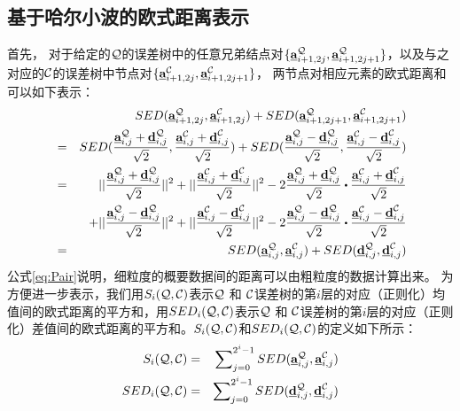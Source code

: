 \subsection{基于哈尔小波的欧式距离表示}
首先， 对于给定的$\cal Q$的误差树中的任意兄弟结点对$\{\emph{{\textbf{a}}}_{i+1,2j}^{\cal Q}, \emph{{\textbf{a}}}_{i+1,2j+1}^{\cal Q}\}$，以及与之对应的$\cal C$的误差树中节点对$\{\emph{{\textbf{a}}}_{i+1, 2j}^{\cal C},  \emph{{\textbf{a}}}_{i+1, 2j+1}^{\cal C} \}$，
 两节点对相应元素的欧式距离和可以如下表示：
  \allowdisplaybreaks
 \begin{eqnarray}\label{eq:Pair}
&& SED(\va_{i+1,2j}^{\cal Q},\va_{i+1,2j}^{\cal C}) + SED(\va_{i+1,2j+1}^{\cal Q},\va_{i+1,2j+1}^{\cal C}) \\ \nonumber
&=& SED(\frac{\va_{i,j}^{\cal Q} + \vd_{i,j}^{\cal Q}}{\sqrt{2}}, \frac{\va_{i,j}^{\cal C}+ \vd_{i,j}^{\cal C}}{\sqrt{2}}) + 
SED(\frac{\va_{i,j}^{\cal Q} - \vd_{i,j}^{\cal Q}}{\sqrt{2}}, \frac{\va_{i,j}^{\cal C} - \vd_{i,j}^{\cal C}}{\sqrt{2}}) \\ \nonumber 
&=& ||\frac{\va_{i,j}^{\cal Q}+ \vd_{i,j}^{\cal Q}}{\sqrt{2}}||^2 + ||\frac{\va_{i,j}^{\cal C}+ \vd_{i,j}^{\cal C}}{\sqrt{2}}||^2 
-2 \frac{\va_{i,j}^{\cal Q}+ \vd_{i,j}^{\cal Q}}{\sqrt{2}} \bigcdot \frac{\va_{i,j}^{\cal C}+ \vd_{i,j}^{\cal C}}{\sqrt{2}}
\\ \nonumber
&&+ ||\frac{\va_{i,j}^{\cal Q} - \vd_{i,j}^{\cal Q}}{\sqrt{2}}||^2 + ||\frac{\va_{i,j}^{\cal C} - \vd_{i,j}^{\cal C}}{\sqrt{2}}||^2  -2 \frac{\va_{i,j}^{\cal Q} - \vd_{i,j}^{\cal Q}}{\sqrt{2}} \bigcdot \frac{\va_{i,j}^{\cal C} - \vd_{i,j}^{\cal C}}{\sqrt{2}}\\ \nonumber
&=& SED(\va_{i,j}^{\cal Q}, \va_{i,j}^{\cal C}) + SED(\vd_{i,j}^{\cal Q}, \vd_{i,j}^{\cal C})
 \end{eqnarray}
 \allowdisplaybreaks[4]
公式\ref{eq:Pair}说明，细粒度的概要数据间的距离可以由粗粒度的数据计算出来。
为方便进一步表示，我们用$S_{i}(\cal Q, \cal C)$表示${\cal Q}$ 和 ${\cal C}$误差树的第$i$层的对应（正则化）均值间的欧式距离的平方和，用$SED_{i}(\cal Q, \cal C)$表示${\cal Q}$ 和 ${\cal C}$误差树的第$i$层的对应（正则化）差值间的欧式距离的平方和。$S_{i}(\cal Q, \cal C)$和$SED_{i}(\cal Q, \cal C)$的定义如下所示：
\begin{eqnarray}\label{eq:basic}
S_{i}({\cal Q}, {\cal C})& = & \sum\nolimits_{j=0}^{2^{i}-1}SED( \emph{{\textbf{a}}}_{i,j}^{\cal Q}, \emph{{\textbf{a}}}_{i,j}^{\cal C})\label{eq:defSI}  \\
SED_{i}({\cal Q}, {\cal C}) & = & \sum\nolimits_{j=0}^{2^{i}-1}SED(\emph{{\textbf{d}}}_{i,j}^{\cal Q}, \emph{{\textbf{d}}}_{i,j}^{\cal C})   \label{eq:defSEDI}
\end{eqnarray}
